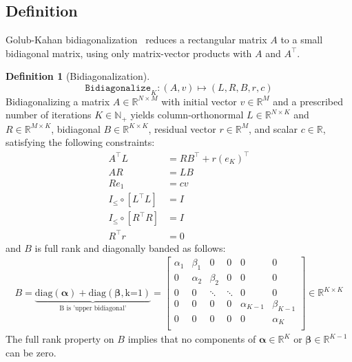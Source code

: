 \documentclass[a4paper,12pt]{article}
\theoremstyle{definition}
\newtheorem{definition}{Definition}
\begin{document}
\subsection{Definition}\label{subsec:bidiag}
Golub-Kahan bidiagonalization~\citep{golub1965calculating} reduces a rectangular matrix $A$ to a small bidiagonal matrix, using only matrix-vector products with $A$ and $A^\top$.
\begin{definition}[Bidiagonalization]\label{def:bidiag}
$$\texttt{Bidiagonalize}_K: (A, v) \mapsto (L, R, B, r, c)$$
Bidiagonalizing a matrix $A \in \mathbb{R}^{N \times M}$ with initial vector $v \in \mathbb{R}^M$ and a prescribed number of iterations $K \in \mathbb{N}_+$ yields column-orthonormal $L \in \mathbb{R}^{N \times K}$ and $R \in \mathbb{R}^{M \times K}$, bidiagonal $B \in \mathbb{R}^{K \times K}$, residual vector $r \in \mathbb{R}^M$, and scalar $c \in \mathbb{R}$, satisfying the following constraints:
\begin{align}
    A^\top L &= RB^\top + r(e_K)^\top \label{eq:bidiag_forward_constraint1}
    \\
    AR &= LB \label{eq:bidiag_forward_constraint2}
    \\
    Re_1 &= cv \label{eq:bidiag_forward_constraint3}
    \\
    I_{\leq} \circ [L^\top L] &= I \label{eq:bidiag_forward_constraint4}
    \\
    I_{\leq} \circ [R^\top R] &= I \label{eq:bidiag_forward_constraint5}
    \\
    R^\top r &= 0 \label{eq:bidiag_forward_constraint6}
\end{align}
and $B$ is full rank and diagonally banded as follows:
\begin{align}
B = \underbrace{\text{diag}(\boldsymbol{\alpha}) + \text{diag}(\boldsymbol{\beta}, \text{k=1})}_{\text{B is 'upper bidiagonal'}} = \begin{bmatrix}
\alpha_1  & \beta_1 & 0 & 0 & 0 & 0 \\
0 & \alpha_2 & \beta_2 & 0 & 0 & 0\\
0 & 0 & \ddots & \ddots & 0 & 0\\
0 & 0 & 0 & 0 & \alpha_{K-1}  & \beta_{K-1}\\
0 & 0 & 0 & 0 & 0 & \alpha_K\\
\end{bmatrix} \in \mathbb{R}^{K \times K} \label{eq:bidiag_forward_constraint7}
\end{align}
The full rank property on $B$ implies that no components of $\boldsymbol{\alpha} \in \mathbb{R}^K$ or $\boldsymbol{\beta} \in \mathbb{R}^{K-1}$ can be zero.
\end{definition}
\end{document}
